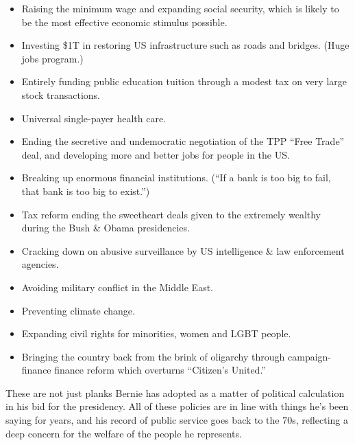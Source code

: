 \documentclass[notumble]{leaflet}
\begin{document}
\begin{itemize}

\item Raising the minimum wage and expanding social security, which is
  likely to be the most effective economic stimulus possible.

\item Investing \$1T in restoring US infrastructure such as roads and
  bridges.  (Huge jobs program.)

\item Entirely funding public education tuition through a modest tax
  on very large stock transactions.

\item Universal single-payer health care.

\item Ending the secretive and undemocratic negotiation of the TPP
  ``Free Trade'' deal, and developing more and better jobs for people
  in the US.

\item Breaking up enormous financial institutions.  (``If a bank is
  too big to fail, that bank is too big to exist.'')

\item Tax reform ending the sweetheart deals given to the extremely
  wealthy during the Bush \& Obama presidencies.

\item Cracking down on abusive surveillance by US intelligence \& law
  enforcement agencies.

\item Avoiding military conflict in the Middle East.

\item Preventing climate change.

\item Expanding civil rights for minorities, women and LGBT people.

\item Bringing the country back from the brink of oligarchy through
  campaign-finance finance reform which overturns ``Citizen's
  United.''

\end{itemize}

These are not just planks Bernie has adopted as a matter of political
calculation in his bid for the presidency.  All of these policies are
in line with things he's been saying for years, and his record of
public service goes back to the 70s, reflecting a deep concern for the
welfare of the people he represents.  
\end{document}
